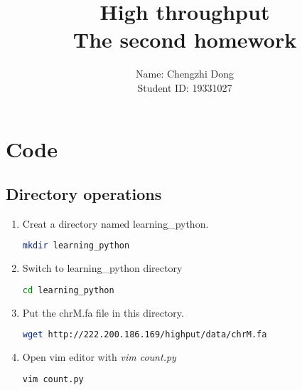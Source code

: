 \documentclass[a4paper]{article}
\title{\Huge \bf High throughput\\ \huge The second homework}
\author{Name: Chengzhi Dong \\ Student ID: 19331027}
\date{}
\begin{document}
    \maketitle
    
	\section{Code}
	\subsection{Directory operations}
	\begin{enumerate}
		\item Creat a directory named learning\_python.
		\begin{lstlisting}[language=bash]
mkdir learning_python
		\end{lstlisting}
	
		\item Switch to learning\_python directory
		\begin{lstlisting}[language=bash]
cd learning_python
		\end{lstlisting}		

		\item Put the chrM.fa file in this directory.
		\begin{lstlisting}[language=bash]
wget http://222.200.186.169/highput/data/chrM.fa
		\end{lstlisting}
	
		\item Open vim editor with \textit{vim count.py}
		\begin{lstlisting}[language=bash]
vim count.py
		\end{lstlisting}	
	\end{enumerate}
\end{document}
